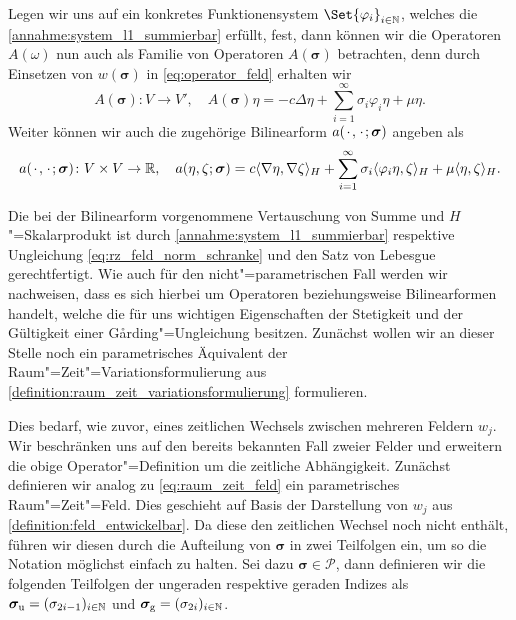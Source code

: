 \documentclass[../main.tex]{subfiles}
\begin{document}
Legen wir uns auf ein konkretes Funktionensystem $\Set{\varphi_{i}}_{i \in \mathbb{N}}$, welches die \cref{annahme:system_l1_summierbar} erfüllt, fest, dann können wir die Operatoren $A(\omega)$ nun auch als Familie von Operatoren $A(\bm\sigma)$ betrachten, denn durch Einsetzen von $w(\bm\sigma)$ in \cref{eq:operator_feld} erhalten wir
\begin{equation}
\label{eq:operator_parameter}
    A(\bm\sigma) \colon V \to V', \quad A(\bm\sigma) \eta = -c \Delta \eta + \sum_{i = 1}^{\infty} \sigma_{i} \varphi_{i} \eta + \mu \eta.
\end{equation}
Weiter können wir auch die zugehörige Bilinearform $a({\mkern2mu\cdot\mkern2mu}, {\mkern2mu\cdot\mkern2mu}; \bm\sigma)$ angeben als
\begin{equation}
\label{eq:bilinearform_parameter}
    \begin{aligned}
    a({\mkern2mu\cdot\mkern2mu}, {\mkern2mu\cdot\mkern2mu}; \bm\sigma) \colon V \times V \to \mathbb{R},
    \quad a(\eta, \zeta; \bm\sigma) = c\langle\nabla \eta,\nabla \zeta\rangle_{H} + \sum_{i = 1}^{\infty} \sigma_{i} \langle\varphi_{i} \eta,\zeta\rangle_{H} + \mu \langle\eta,\zeta\rangle_{H}.
    \end{aligned}
\end{equation}

Die bei der Bilinearform vorgenommene Vertauschung von Summe und $H$"=Skalarprodukt ist durch \cref{annahme:system_l1_summierbar} respektive Ungleichung \cref{eq:rz_feld_norm_schranke} und den Satz von Lebesgue gerechtfertigt.
Wie auch für den nicht"=parametrischen Fall werden wir nachweisen, dass es sich hierbei um Operatoren beziehungsweise Bilinearformen handelt, welche die für uns wichtigen Eigenschaften der Stetigkeit und der Gültigkeit einer G\aa{}rding"=Ungleichung besitzen.
Zunächst wollen wir an dieser Stelle noch ein parametrisches Äquivalent der Raum"=Zeit"=Variationsformulierung aus \cref{definition:raum_zeit_variationsformulierung} formulieren.

Dies bedarf, wie zuvor, eines zeitlichen Wechsels zwischen mehreren Feldern $w_{j}$.
Wir beschränken uns auf den bereits bekannten Fall zweier Felder und erweitern die obige Operator"=Definition um die zeitliche Abhängigkeit.
Zunächst definieren wir analog zu \cref{eq:raum_zeit_feld} ein parametrisches Raum"=Zeit"=Feld.
Dies geschieht auf Basis der Darstellung von $w_{j}$ aus \cref{definition:feld_entwickelbar}.
Da diese den zeitlichen Wechsel noch nicht enthält, führen wir diesen durch die Aufteilung von $\bm \sigma$ in zwei Teilfolgen ein, um so die Notation möglichst einfach zu halten.
Sei dazu $\bm\sigma \in \mathcal P$, dann definieren wir die folgenden Teilfolgen der ungeraden respektive geraden Indizes als $\bm\sigma_{\text{u}} = (\sigma_{2i-1})_{i \in \mathbb{N}}$ und $\bm\sigma_{\text{g}} = (\sigma_{2i})_{i \in \mathbb{N}}$.
\end{document}
